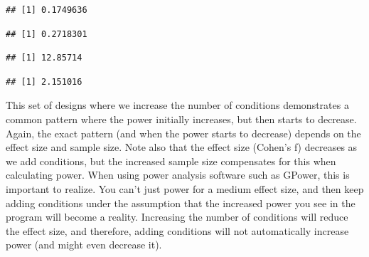 \documentclass[]{book}
\newenvironment{Shaded}{\begin{snugshade}}{\end{snugshade}}
\newcommand{\KeywordTok}[1]{\textcolor[rgb]{0.13,0.29,0.53}{\textbf{#1}}}
\newcommand{\NormalTok}[1]{#1}
\newcommand{\OperatorTok}[1]{\textcolor[rgb]{0.81,0.36,0.00}{\textbf{#1}}}
\begin{document}
\begin{verbatim}
## [1] 0.1749636
\end{verbatim}

\begin{Shaded}
\end{Shaded}

\begin{verbatim}
## [1] 0.2718301
\end{verbatim}

\begin{Shaded}
\end{Shaded}

\begin{verbatim}
## [1] 12.85714
\end{verbatim}

\begin{Shaded}
\end{Shaded}

\begin{verbatim}
## [1] 2.151016
\end{verbatim}

This set of designs where we increase the number of conditions demonstrates a common pattern where the power initially increases, but then starts to decrease. Again, the exact pattern (and when the power starts to decrease) depends on the effect size and sample size. Note also that the effect size (Cohen's f) decreases as we add conditions, but the increased sample size compensates for this when calculating power. When using power analysis software such as GPower, this is important to realize. You can't just power for a medium effect size, and then keep adding conditions under the assumption that the increased power you see in the program will become a reality. Increasing the number of conditions will reduce the effect size, and therefore, adding conditions will not automatically increase power (and might even decrease it).
\end{document}
